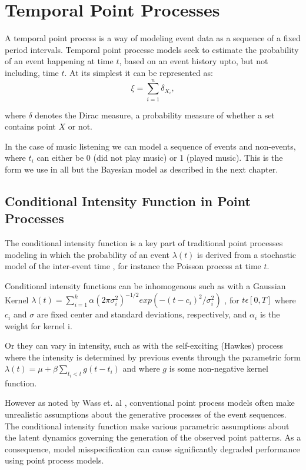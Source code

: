 \section{Temporal Point Processes}

A temporal point process \parencite{DaleyJones} is a way of modeling event data as a sequence of a fixed period intervals. Temporal point processe models seek to estimate the probability of an event happening at time $t$, based on an event history upto, but not including, time $t$.  At its simplest it can be represented as:
$${\xi =\sum _{i=1}^{n}\delta _{X_{i}},}$$

where $\delta$ denotes the Dirac measure, a probability measure of whether a set contains point $X$ or not.

In the case of music listening we can model a sequence of events and non-events, where $t_i$ can either be 0 (did not play music) or 1 (played music). This is the form we use in all but the Bayesian model as described in the next chapter.

\subsection{Conditional Intensity Function in Point Processes}

The conditional intensity function is a key part of traditional point processes modeling in which the probability of an event $\lambda(t)$ is derived from a stochastic model of the inter-event time \parencite{DuWang}, for instance the Poisson process at time $t$.

Conditional intensity functions can be inhomogenous such as with a Gaussian Kernel $\lambda(t) = \sum^k_{i=1}\alpha(2\pi \sigma^2_i)^{-1/2}exp(-(t-c_i)^2/\sigma^2_i)$
, for $t \epsilon [0,T]$ where $c_i$ and $\sigma$ are fixed center and standard deviations, respectively, and $\alpha_i$ is the weight for kernel i.

Or they can vary in intensity, such as with the self-exciting (Hawkes) process where the intensity is determined by previous events through the parametric form $\lambda(t) = \mu + \beta \sum_{t_i<t}g(t-t_i)$ and where $g$ is some non-negative kernel function.

However as noted by Wass et. al \parencite{Wass}, conventional point process models often make unrealistic assumptions about the generative processes of the event sequences. The conditional intensity function make various parametric assumptions about the latent dynamics governing the generation of the observed point patterns. As a consequence, model misspecification can cause significantly degraded performance using point process models.


